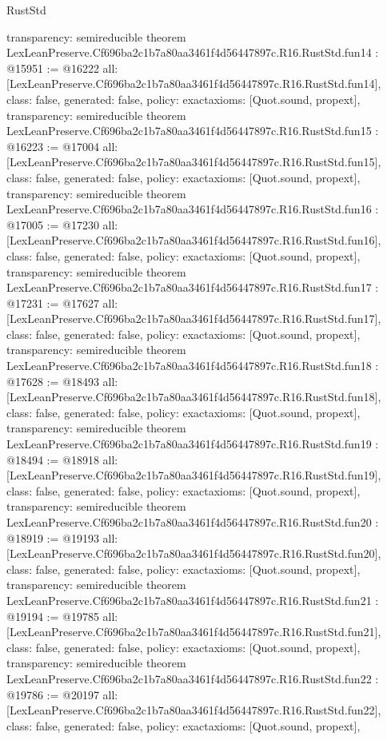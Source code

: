 \begin{lexlean}{RustStd}
\begin{coremodule}
{  transparency: semireducible
}
theorem LexLeanPreserve.Cf696ba2c1b7a80aa3461f4d56447897c.R16.RustStd.fun14 : @15951 := @16222 {
  all: [LexLeanPreserve.Cf696ba2c1b7a80aa3461f4d56447897c.R16.RustStd.fun14],
  class: false,
  generated: false,
  policy: exact{axioms: [Quot.sound, propext]},
  transparency: semireducible
}
theorem LexLeanPreserve.Cf696ba2c1b7a80aa3461f4d56447897c.R16.RustStd.fun15 : @16223 := @17004 {
  all: [LexLeanPreserve.Cf696ba2c1b7a80aa3461f4d56447897c.R16.RustStd.fun15],
  class: false,
  generated: false,
  policy: exact{axioms: [Quot.sound, propext]},
  transparency: semireducible
}
theorem LexLeanPreserve.Cf696ba2c1b7a80aa3461f4d56447897c.R16.RustStd.fun16 : @17005 := @17230 {
  all: [LexLeanPreserve.Cf696ba2c1b7a80aa3461f4d56447897c.R16.RustStd.fun16],
  class: false,
  generated: false,
  policy: exact{axioms: [Quot.sound, propext]},
  transparency: semireducible
}
theorem LexLeanPreserve.Cf696ba2c1b7a80aa3461f4d56447897c.R16.RustStd.fun17 : @17231 := @17627 {
  all: [LexLeanPreserve.Cf696ba2c1b7a80aa3461f4d56447897c.R16.RustStd.fun17],
  class: false,
  generated: false,
  policy: exact{axioms: [Quot.sound, propext]},
  transparency: semireducible
}
theorem LexLeanPreserve.Cf696ba2c1b7a80aa3461f4d56447897c.R16.RustStd.fun18 : @17628 := @18493 {
  all: [LexLeanPreserve.Cf696ba2c1b7a80aa3461f4d56447897c.R16.RustStd.fun18],
  class: false,
  generated: false,
  policy: exact{axioms: [Quot.sound, propext]},
  transparency: semireducible
}
theorem LexLeanPreserve.Cf696ba2c1b7a80aa3461f4d56447897c.R16.RustStd.fun19 : @18494 := @18918 {
  all: [LexLeanPreserve.Cf696ba2c1b7a80aa3461f4d56447897c.R16.RustStd.fun19],
  class: false,
  generated: false,
  policy: exact{axioms: [Quot.sound, propext]},
  transparency: semireducible
}
theorem LexLeanPreserve.Cf696ba2c1b7a80aa3461f4d56447897c.R16.RustStd.fun20 : @18919 := @19193 {
  all: [LexLeanPreserve.Cf696ba2c1b7a80aa3461f4d56447897c.R16.RustStd.fun20],
  class: false,
  generated: false,
  policy: exact{axioms: [Quot.sound, propext]},
  transparency: semireducible
}
theorem LexLeanPreserve.Cf696ba2c1b7a80aa3461f4d56447897c.R16.RustStd.fun21 : @19194 := @19785 {
  all: [LexLeanPreserve.Cf696ba2c1b7a80aa3461f4d56447897c.R16.RustStd.fun21],
  class: false,
  generated: false,
  policy: exact{axioms: [Quot.sound, propext]},
  transparency: semireducible
}
theorem LexLeanPreserve.Cf696ba2c1b7a80aa3461f4d56447897c.R16.RustStd.fun22 : @19786 := @20197 {
  all: [LexLeanPreserve.Cf696ba2c1b7a80aa3461f4d56447897c.R16.RustStd.fun22],
  class: false,
  generated: false,
  policy: exact{axioms: [Quot.sound, propext]},
}
\end{coremodule}
\end{lexlean}
